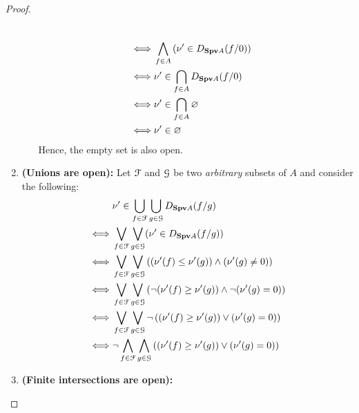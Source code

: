\begin{proof}
\begin{enumerate}
\begin{enumerate}
$$\begin{aligned}
                                                    \\
                                                    \iff & \bigwedge_{f \in A} \left(\nu' \in D_{\mathbf{Spv} A}(f/0)\right)
                                                    \\
                                                    \iff & \nu' \in \bigcap_{f \in A} D_{\mathbf{Spv} A}(f/0)
                                                    \\
                                                    \iff & \nu' \in \bigcap_{f \in A} \varnothing
                                                    \\
                                                    \iff & \nu' \in \varnothing
                                                \end{aligned}
                                            $$
                                        Hence, the empty set is also open.
                                    \end{enumerate}
                                \item \textbf{(Unions are open):} Let $\mathcal{F}$ and $\mathcal{G}$ be two \textit{arbitrary} subsets of $A$ and consider the following:
                                    $$
                                        \begin{aligned}
                                            & \nu' \in \bigcup_{f \in \mathcal{F}} \bigcup_{g \in \mathcal{G}} D_{\mathbf{Spv} A}(f/g)
                                            \\
                                            \iff & \bigvee_{f \in \mathcal{F}} \bigvee_{g \in \mathcal{G}} (\nu' \in D_{\mathbf{Spv} A}(f/g))
                                            \\
                                            \iff & \bigvee_{f \in \mathcal{F}} \bigvee_{g \in \mathcal{G}} \left((\nu'(f) \leq \nu'(g)) \wedge (\nu'(g) \not = 0)\right)
                                            \\
                                            \iff & \bigvee_{f \in \mathcal{F}} \bigvee_{g \in \mathcal{G}} \left(\neg(\nu'(f) \geq \nu'(g)) \wedge \neg(\nu'(g) = 0)\right)
                                            \\
                                            \iff & \bigvee_{f \in \mathcal{F}} \bigvee_{g \in \mathcal{G}} \neg \left((\nu'(f) \geq \nu'(g)) \vee (\nu'(g) = 0)\right)
                                            \\
                                            \iff & \neg \bigwedge_{f \in \mathcal{F}} \bigwedge_{g \in \mathcal{G}} \left((\nu'(f) \geq \nu'(g)) \vee (\nu'(g) = 0)\right)
                                        \end{aligned}
                                    $$
                                \item \textbf{(Finite intersections are open):}
                            \end{enumerate}
                    \end{proof}
